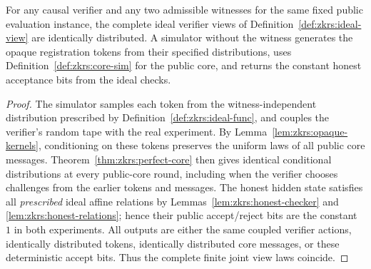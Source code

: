 \begin{theorem}\label{thm:zkrs:ideal-full-zk}
For any causal verifier and any two admissible witnesses
for the same fixed public evaluation instance, the complete
ideal verifier views of Definition~\ref{def:zkrs:ideal-view}
are identically distributed. A simulator without the witness
generates the opaque registration tokens from their specified
distributions, uses Definition~\ref{def:zkrs:core-sim}
for the public core, and returns the constant honest
acceptance bits from the ideal checks.
\end{theorem}
\begin{proof}
The simulator samples each token from the
witness-independent distribution prescribed by
Definition~\ref{def:zkrs:ideal-func}, and couples
the verifier's random tape with the real experiment.
By Lemma~\ref{lem:zkrs:opaque-kernels},
conditioning on these tokens preserves the
uniform laws of all public core messages.
Theorem~\ref{thm:zkrs:perfect-core}
then gives identical conditional distributions
at every public-core round, including when
the verifier chooses challenges from the
earlier tokens and messages.
The honest hidden state satisfies all
\emph{prescribed} ideal affine relations by
Lemmas~\ref{lem:zkrs:honest-checker} and
\ref{lem:zkrs:honest-relations};
hence their public accept/reject bits are
the constant $1$ in both experiments.
All outputs are either the same coupled
verifier actions, identically distributed
tokens, identically distributed core messages,
or these deterministic accept bits.
Thus the complete finite joint view laws
coincide.
\end{proof}

